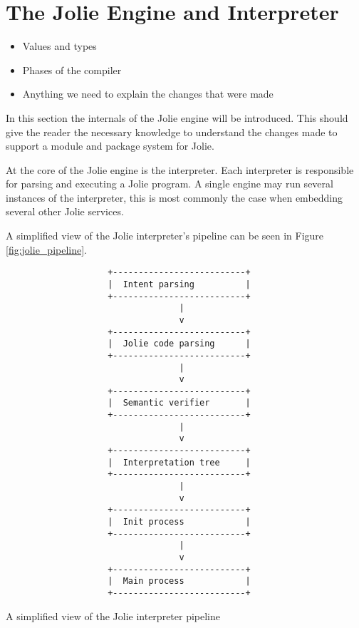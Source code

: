 
\section{The Jolie Engine and Interpreter}

\begin{itemize}
\item Values and types
\item Phases of the compiler
\item Anything we need to explain the changes that were made
\end{itemize}


In this section the internals of the Jolie engine will be introduced. This
should give the reader the necessary knowledge to understand the changes made
to support a module and package system for Jolie.

At the core of the Jolie engine is the interpreter. Each interpreter is
responsible for parsing and executing a Jolie program. A single engine may run
several instances of the interpreter, this is most commonly the case when
embedding several other Jolie services.

A simplified view of the Jolie interpreter's pipeline can be seen in Figure
\ref{fig:jolie_pipeline}.

\begin{listing}[H]
\begin{verbatim}
                    +--------------------------+
                    |  Intent parsing          |
                    +--------------------------+
                                  |
                                  v
                    +--------------------------+
                    |  Jolie code parsing      |
                    +--------------------------+
                                  |
                                  v
                    +--------------------------+
                    |  Semantic verifier       |
                    +--------------------------+
                                  |
                                  v
                    +--------------------------+
                    |  Interpretation tree     |
                    +--------------------------+
                                  |
                                  v
                    +--------------------------+
                    |  Init process            |
                    +--------------------------+
                                  |
                                  v
                    +--------------------------+
                    |  Main process            |
                    +--------------------------+
\end{verbatim}
\caption{A simplified view of the Jolie interpreter pipeline}
\label{fig:jolie_pipeline}
\end{listing}

